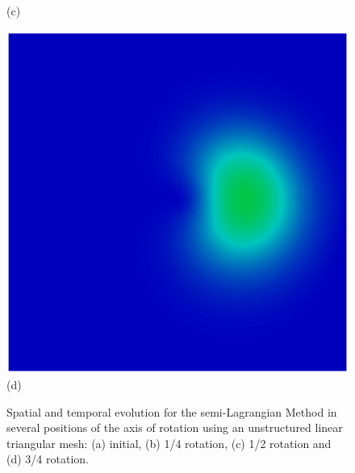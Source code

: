 \begin{figure}[H]
\begin{minipage}{.5\linewidth}
      (c)
     \end{minipage}%
     \begin{minipage}{.5\linewidth}
      \centering
      \includegraphics[scale=0.42]{./02_chaps/cap_validation/figure/figSLlinear3.png}\\
      (d)
     \end{minipage}
     \medskip
     \caption{
Spatial and temporal evolution for the semi-Lagrangian Method in several positions of the axis of rotation using an unstructured linear triangular mesh:	
     (a) initial, 
     (b) 1/4 rotation,
     (c) 1/2 rotation and
     (d) 3/4 rotation.}
     \label{SL linear fig}
\end{figure}


